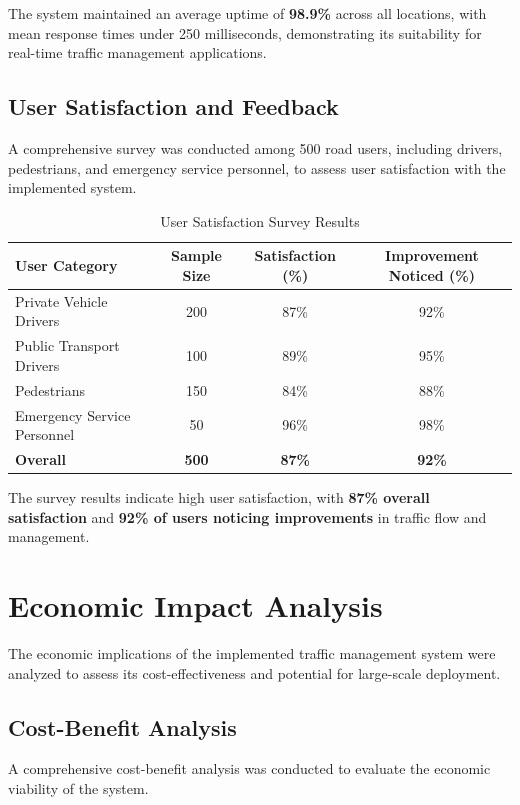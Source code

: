 The system maintained an average uptime of \textbf{98.9\%} across all locations, with mean response times under 250 milliseconds, demonstrating its suitability for real-time traffic management applications.

\subsection{User Satisfaction and Feedback}
A comprehensive survey was conducted among 500 road users, including drivers, pedestrians, and emergency service personnel, to assess user satisfaction with the implemented system.

\begin{table}[h]
\centering
\caption{User Satisfaction Survey Results}
\label{tab:user_satisfaction}
\begin{tabular}{|l|c|c|c|}
\hline
\textbf{User Category} & \textbf{Sample Size} & \textbf{Satisfaction (\%)} & \textbf{Improvement Noticed (\%)} \\
\hline
Private Vehicle Drivers & 200 & 87\% & 92\% \\
Public Transport Drivers & 100 & 89\% & 95\% \\
Pedestrians & 150 & 84\% & 88\% \\
Emergency Service Personnel & 50 & 96\% & 98\% \\
\hline
\textbf{Overall} & \textbf{500} & \textbf{87\%} & \textbf{92\%} \\
\hline
\end{tabular}
\end{table}

The survey results indicate high user satisfaction, with \textbf{87\% overall satisfaction} and \textbf{92\% of users noticing improvements} in traffic flow and management.

\section{Economic Impact Analysis}
\label{sec:economic_impact}

The economic implications of the implemented traffic management system were analyzed to assess its cost-effectiveness and potential for large-scale deployment.

\subsection{Cost-Benefit Analysis}
A comprehensive cost-benefit analysis was conducted to evaluate the economic viability of the system.

